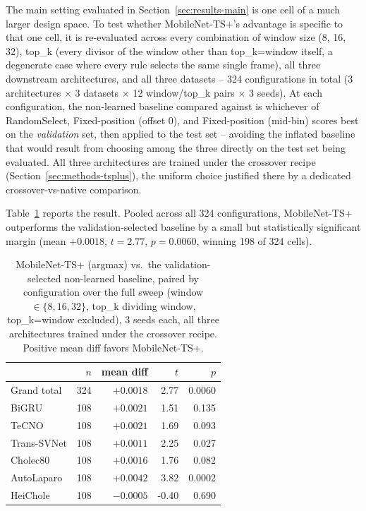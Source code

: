 \documentclass[preprint,12pt]{elsarticle}
\begin{document}
The main setting evaluated in Section~\ref{sec:results-main} is one cell of a much larger design space. To test whether MobileNet-TS+'s advantage is specific to that one cell, it is re-evaluated across every combination of window size (8, 16, 32), top\_k (every divisor of the window other than top\_k=window itself, a degenerate case where every rule selects the same single frame), all three downstream architectures, and all three datasets -- 324 configurations in total (3 architectures $\times$ 3 datasets $\times$ 12 window/top\_k pairs $\times$ 3 seeds). At each configuration, the non-learned baseline compared against is whichever of RandomSelect, Fixed-position (offset 0), and Fixed-position (mid-bin) scores best on the \emph{validation} set, then applied to the test set -- avoiding the inflated baseline that would result from choosing among the three directly on the test set being evaluated. All three architectures are trained under the crossover recipe (Section~\ref{sec:methods-tsplus}), the uniform choice justified there by a dedicated crossover-vs-native comparison.

Table~\ref{tab:sweep} reports the result. Pooled across all 324 configurations, MobileNet-TS+ outperforms the validation-selected baseline by a small but statistically significant margin (mean $+0.0018$, $t=2.77$, $p=0.0060$, winning 198 of 324 cells).

\begin{table}[t]
\centering
\caption{MobileNet-TS+ (argmax) vs.\ the validation-selected non-learned baseline, paired by configuration over the full sweep (window $\in\{8,16,32\}$, top\_k dividing window, top\_k=window excluded), 3 seeds each, all three architectures trained under the crossover recipe. Positive mean diff favors MobileNet-TS+.}
\label{tab:sweep}
\begin{tabular}{lrrrr}
\toprule
 & $n$ & mean diff & $t$ & $p$ \\
\midrule
Grand total & 324 & $+0.0018$ & 2.77 & 0.0060 \\
\midrule
\quad BiGRU & 108 & $+0.0021$ & 1.51 & 0.135 \\
\quad TeCNO & 108 & $+0.0021$ & 1.69 & 0.093 \\
\quad Trans-SVNet & 108 & $+0.0011$ & 2.25 & 0.027 \\
\midrule
\quad Cholec80 & 108 & $+0.0016$ & 1.76 & 0.082 \\
\quad AutoLaparo & 108 & $+0.0042$ & 3.82 & 0.0002 \\
\quad HeiChole & 108 & $-0.0005$ & -0.40 & 0.690 \\
\bottomrule
\end{tabular}
\end{table}
\end{document}
